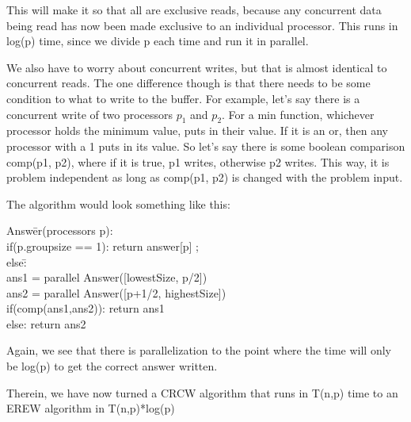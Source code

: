 \documentclass{article}
\begin{document}
\begin{enumerate}
This will make it so that all are exclusive reads, because any concurrent data being read has now been made exclusive to an individual processor. This runs in log(p) time, since we divide p each time and run it in parallel.

We also have to worry about concurrent writes, but that is almost identical to concurrent reads. The one difference though is that there needs to be some condition to what to write to the buffer. For example, let's say there is a concurrent write of two processors $p_1$ and $p_2$. For a min function, whichever processor holds the minimum value, puts in their value. If it is an or, then any processor with a 1 puts in its value. So let's say there is some boolean comparison comp(p1, p2), where if it is true, p1 writes, otherwise p2 writes. This way, it is problem independent as long as comp(p1, p2) is changed with the problem input.

The algorithm would look something like this:
\begin{tabbing}
Answ\=er(processors p):\\
\>if(p.groupsize == 1): return answer[p] ;\\
\>else\=:\\
\>\>ans1 = parallel Answer([lowestSize, p/2])\\
\>\>ans2 = parallel Answer([p+1/2, highestSize])\\
\>\>if(comp(ans1,ans2)): return ans1\\
\>\>else: return ans2\\
\end{tabbing}
Again, we see that there is parallelization to the point where the time will only be log(p) to get the correct answer written.

Therein, we have now turned a CRCW algorithm that runs in T(n,p) time to an EREW algorithm in T(n,p)*log(p)
\end{enumerate}
\end{document}

